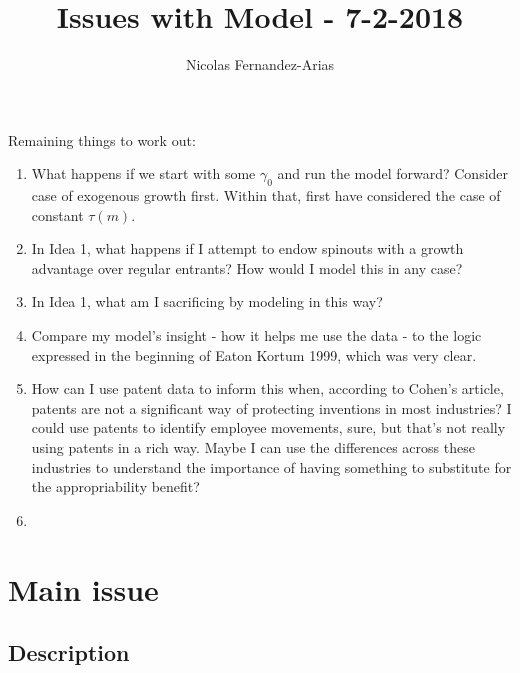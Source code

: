 \documentclass[12pt,english]{article}
\theoremstyle{remark}
\begin{document}
	
\title{Issues with Model - 7-2-2018}
\author{Nicolas Fernandez-Arias}
\maketitle

Remaining things to work out:
\begin{enumerate}
	\item What happens if we start with some $\gamma_0$ and run the model forward? Consider case of exogenous growth first. Within that, first have considered the case of constant $\tau(m)$. 
	\item In Idea 1, what happens if I attempt to endow spinouts with a growth advantage over regular entrants? How would I model this in any case?
	\item In Idea 1, what am I sacrificing by modeling in this way?
	\item Compare my model's insight - how it helps me use the data - to the logic expressed in the beginning of Eaton Kortum 1999, which was very clear.
	\item How can I use patent data to inform this when, according to Cohen's article, patents are not a significant way of protecting inventions in most industries? I could use patents to identify employee movements, sure, but that's not really using patents in a rich way. Maybe I can use the differences across these industries to understand the importance of having something to substitute for the appropriability benefit? 
	\item 
\end{enumerate}

\section{Main issue}

\subsection{Description}
\end{document}
